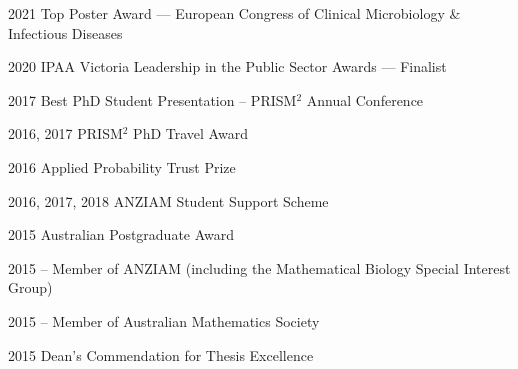 \documentclass[9pt]{developercv} %
\begin{document}
\begin{entrylist}
    \award
        {2021}
        {Top Poster Award --- European Congress of Clinical Microbiology \& Infectious Diseases}
        
    \award
        {2020}
        {IPAA Victoria Leadership in the Public Sector Awards --- Finalist}
        
    \award
        {2017}
        {Best PhD Student Presentation -- PRISM$^2$ Annual Conference}

    \award
        {2016, 2017}
        {PRISM$^2$ PhD Travel Award}

    \award
        {2016}
        {Applied Probability Trust Prize}

    \award
        {2016, 2017, 2018}
        {ANZIAM Student Support Scheme}

    \award
        {2015}
        {Australian Postgraduate Award}

    \award
        {2015 --}
        {Member of ANZIAM (including the Mathematical Biology Special Interest Group)}

    \award
        {2015 -- }
        {Member of Australian Mathematics Society}

    \award
        {2015}
        {Dean's Commendation for Thesis Excellence}
\end{entrylist}
%
\end{document}
